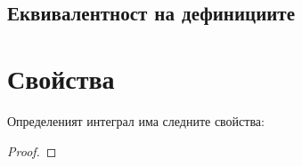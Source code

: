\subsection{Еквивалентност на дефинициите}

\section{Свойства}

Определеният интеграл има следните свойства:
\begin{theorem}
    \begin{proof}

    \end{proof}
\end{theorem}